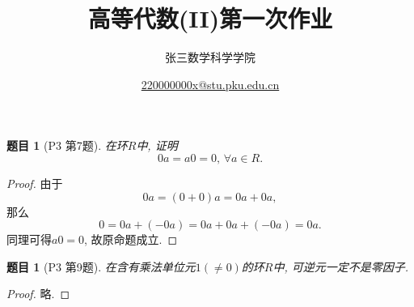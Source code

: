 \documentclass{article}
\title{高等代数(II)第一次作业}
\author{张三\hspace*{5ex}数学科学学院}
\date{\href{mailto:220000000x@stu.pku.edu.cn}{220000000x@stu.pku.edu.cn}}
\newtheorem{Prob}[prob]{题目}
\begin{document}
\maketitle
\begin{Prob}[P3 第7题]在环$R$中, 证明
    \[0a=a0=0,\,\forall a\in R.\]
\end{Prob}
\begin{proof}
    由于
    \[0a=(0+0)a=0a+0a,\]
    那么
    \[0=0a+(-0a)=0a+0a+(-0a)=0a.\]
    同理可得$a0=0$, 故原命题成立.
\end{proof}
\begin{Prob}[P3 第9题]在含有乘法单位元$1(\neq0)$的环$R$中, 可逆元一定不是零因子.
\end{Prob}
\begin{proof}
    略.
\end{proof}
\end{document}
